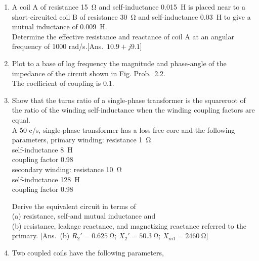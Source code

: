 \documentclass[a4paper,numbers=noenddot,12pt]{scrbook}
\begin{document}
                \begin{enumerate}[label={\thechapter.\arabic*},leftmargin=*]
                    \item A coil A of resistance \SI{15}{\ohm} and self-inductance \SI{0.015}{\henry} is placed near to a short-circuited coil B of resistance \SI{30}{\ohm} and self-inductance \SI{0.03}{\henry} to give a mutual inductance of \SI{0.009}{\henry}.\\ \indent 
                        Determine the effective resistance and reactance of coil A at an angular frequency of 1000 rad/s.[Ans.\ $10.9 + j9.1$]

                    \item Plot to a base of log frequency the magnitude and phase-angle of the impedance of the circuit shown in Fig. Prob.\ 2.2.\\ 
                        The coefficient of coupling is 0.1.

                    \item Show that the turns ratio of a single-phase transformer is the square­root of the ratio of the winding self-inductance when the winding coupling factors are equal.\\
                        A 50-c/s, single-phase transformer has a loss-free core and the following parameters,
                        primary winding: resistance \SI{1}{\ohm}\\
                        self-inductance \SI{8}{\henry}\\
                        coupling factor 0.98\\
                        secondary winding: 	resistance \SI{10}{\ohm}\\
                        self-inductance \SI{128}{\henry} \\
                        coupling factor 0.98

                        Derive the equivalent circuit in terms of \\
                        (a) resistance, self-and mutual inductance and \\
                        (b) resistance, leakage reactance, and magnetizing reactance referred to the primary. 
                        [Ans.\ (b) $R_2' = \SI{0.625}{\ohm}$; $X_2' = \SI{50.3}{\ohm}$; $X_{m1} = \SI{2460}{\ohm}$]

                    \item Two coupled coils have the following parameters, 


\end{enumerate}
\end{document}
